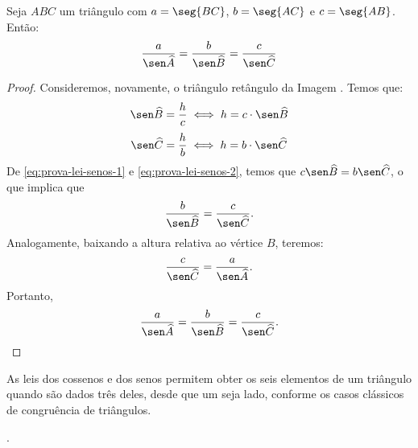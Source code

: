 \begin{theorem}
    Seja $ABC$ um triângulo com $a = \seg {BC}$, $b = \seg {AC}$ e $c = \seg
{AB}$. Então:
$$\frac a {\sen \widehat A} = \frac b {\sen \widehat B} = \frac c {\sen \widehat C}$$
\end{theorem}

\begin{proof}
    Consideremos, novamente, o triângulo retângulo da Imagem . %
    Temos que:
    \begin{equation}
    \label{eq:prova-lei-senos-1}
        \sen \widehat B = \frac h c \iff h = c \cdot \sen \widehat B
    \end{equation}
    \begin{equation}
    \label{eq:prova-lei-senos-2}
        \sen \widehat C = \frac h b \iff h = b \cdot \sen \widehat C
    \end{equation}
    De \ref{eq:prova-lei-senos-1} e \ref{eq:prova-lei-senos-2}, temos que $c \sen \widehat B = b \sen \widehat C$,
    o que implica que $$\frac b {\sen \widehat B} = \frac c {\sen \widehat C}.$$ Analogamente, 
    baixando a altura relativa ao vértice $B$, teremos: $$ \frac c {\sen \widehat C} = \frac a {\sen \widehat A}.$$
    Portanto, $$\frac a {\sen \widehat A} = \frac b {\sen \widehat B} = \frac c {\sen \widehat C}.$$
\end{proof}

As leis dos cossenos e dos senos permitem obter os seis elementos de
um triângulo quando são dados três deles, desde que um seja lado,
conforme os casos clássicos de congruência de triângulos.

\begin{onlineact}
    .
\end{onlineact}